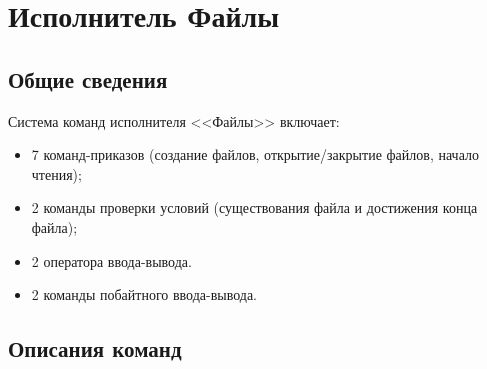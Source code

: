 \section{Исполнитель Файлы}

\subsection{Общие сведения}

Система команд исполнителя <<Файлы>> включает:
\begin{itemize}
\item 7 команд-приказов (создание файлов, открытие/закрытие файлов, начало чтения);
\item 2 команды проверки условий (существования файла и достижения конца файла);
\item 2 оператора ввода-вывода.
\item 2 команды побайтного ввода-вывода.
\end{itemize}

\subsection{Описания команд}

